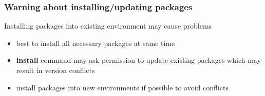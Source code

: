 \documentclass[10pt]{beamer}
\begin{document}
\begin{frame}[fragile]
\frametitle{Warning about installing/updating packages}
Installing packages into existing environment may cause problems
\begin{itemize}
\item best to install all necessary packages at same time
\item \textbf{install} command may ask permission to update existing packages
which may result in version conflicts
\item install packages into new environments if possible to avoid conflicts
\end{itemize}
\end{frame}
\end{document}
